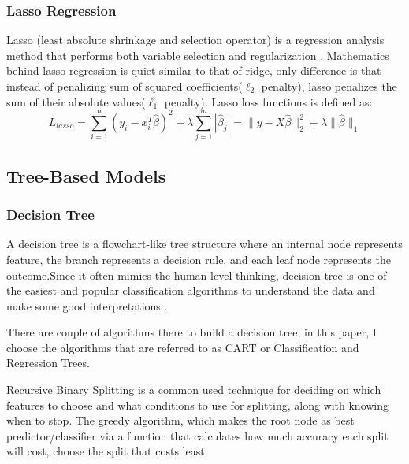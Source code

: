 \documentclass[11pt, a4paper, leqno]{article}
\begin{document}
\subsubsection{Lasso Regression}
Lasso (least absolute shrinkage and selection operator) is a regression analysis method that performs both variable selection and regularization \cite{tibshirani1996regression}. Mathematics behind lasso regression is quiet similar to that of ridge, only difference is that instead of penalizing sum of squared coefficients($\ell_2$ penalty), lasso penalizes the sum of their absolute values($\ell_1$ penalty). Lasso loss functions is defined as:
\begin{equation}
L_{lasso}=\sum_{i=1}^{n}(y_i-x_i^T\hat{\beta})^2+\lambda\sum_{j=1}^{m}|\hat{\beta}_j|=\|y-X\hat{\beta}\|_2^2+\lambda\|\hat{\beta}\|_1
\end{equation}

\subsection{Tree-Based Models}
\subsubsection{Decision Tree}
A decision tree is a flowchart-like tree structure where an internal node represents feature, the branch represents a decision rule, and each leaf node represents the outcome.Since it often mimics the human level thinking, decision tree is one of the easiest and popular classification algorithms to understand the data and make some good interpretations \cite{freund1999alternating}.

There are couple of algorithms there to build a decision tree, in this paper, I choose the algorithms that are referred to as CART or Classification and Regression Trees.

Recursive Binary Splitting is a common used technique for deciding on which features to choose and what conditions to use for splitting, along with knowing when to stop. The greedy algorithm, which makes the root node as best predictor/classifier via a function that calculates how much accuracy each split will cost, choose the split that costs least.
\end{document}
